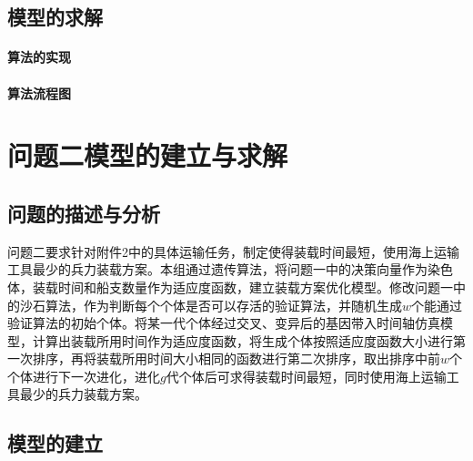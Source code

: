 \documentclass{whutmod}
\begin{document}
  \subsection{模型的求解}
  	\paragraph{算法的实现}
	\paragraph{算法流程图}
		
		
	\section{问题二模型的建立与求解}
	\subsection{问题的描述与分析}
	问题二要求针对附件2中的具体运输任务，制定使得装载时间最短，使用海上运输工具最少的兵力装载方案。本组通过遗传算法，将问题一中的决策向量作为染色体，装载时间和船支数量作为适应度函数，建立装载方案优化模型。修改问题一中的沙石算法，作为判断每个个体是否可以存活的验证算法，并随机生成$w$个能通过验证算法的初始个体。将某一代个体经过交叉、变异后的基因带入时间轴仿真模型，计算出装载所用时间作为适应度函数，将生成个体按照适应度函数大小进行第一次排序，再将装载所用时间大小相同的函数进行第二次排序，取出排序中前$w$个个体进行下一次进化，进化$g$代个体后可求得装载时间最短，同时使用海上运输工具最少的兵力装载方案。
	\subsection{模型的建立}
\end{document}
